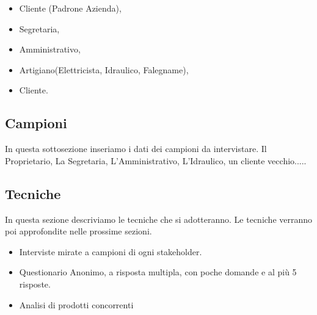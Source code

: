 \documentclass[11pt]{article}
\begin{document}
\begin{itemize}
\item Cliente (Padrone Azienda),
\item Segretaria,
\item Amministrativo,
\item Artigiano(Elettricista, Idraulico, Falegname),
\item Cliente.
\end{itemize}

\subsection{Campioni}
In questa sottosezione inseriamo i dati dei campioni da intervistare.
Il Proprietario, La Segretaria, L'Amministrativo,
 L'Idraulico, un cliente vecchio.....

 \subsection{Tecniche}
In questa sezione descriviamo le tecniche che si adotteranno. Le
tecniche verranno poi approfondite nelle prossime sezioni.
\begin{itemize}
\item Interviste mirate a campioni di ogni stakeholder.
\item Questionario Anonimo, a risposta multipla, con poche domande e
  al pi\`u 5 risposte.
\item Analisi di  prodotti concorrenti
\end{itemize}  
\end{document}
